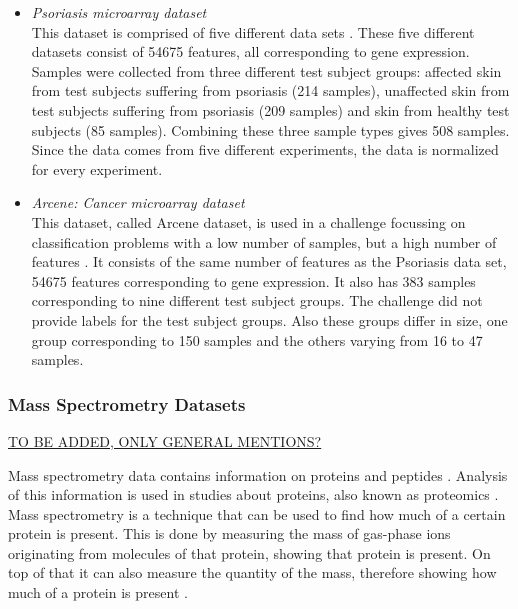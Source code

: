 \documentclass[10pt,a4paper]{report}
\begin{document}
	\begin{itemize}
		\item \textit{Psoriasis microarray dataset} \\ This dataset is comprised of five different data sets \cite{nair2009genome, suarez2012expanding, bigler2013cross, yao2008type}. These five different datasets consist of 54675 features, all corresponding to gene expression. Samples were collected from three different test subject groups: affected skin from test subjects suffering from psoriasis (214 samples), unaffected skin from test subjects suffering from psoriasis (209 samples) and skin from healthy test subjects (85 samples). Combining these three sample types gives 508 samples. Since the data comes from five different experiments, the data is normalized for every experiment.
		\item \textit{Arcene: Cancer microarray dataset} \\ This dataset, called Arcene dataset, is used in a challenge focussing on classification problems with a low number of samples, but a high number of features \cite{wojnarski2010rsctc}. It consists of the same number of features as the Psoriasis data set, 54675 features corresponding to gene expression. It also has 383 samples corresponding to nine different test subject groups. The challenge did not provide labels for the test subject groups. Also these groups differ in size, one group corresponding to 150 samples and the others varying from 16 to 47 samples.
	\end{itemize}
	
	\subsubsection{Mass Spectrometry Datasets} \underline{TO BE ADDED, ONLY GENERAL MENTIONS?}
	\label{PLsubsec:MassSpect}
	
	Mass spectrometry data contains information on proteins and peptides \cite{cottrell1999probability, dettmer2007mass}. Analysis of this information is used in studies about proteins, also known as proteomics \cite{matthiesen2008analysis}. Mass spectrometry is a technique that can be used to find how much of a certain protein is present. This is done by measuring the mass of gas-phase ions originating from molecules of that protein, showing that protein is present. On top of that it can also measure the quantity of the mass, therefore showing how much of a protein is present \cite{watson2007introduction}.
	
\end{document}
